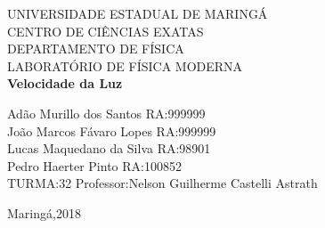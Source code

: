 \documentclass[a4paper,10pt]{article}
\begin{document}
	

\begin{titlepage}
\begin{center}
{\large UNIVERSIDADE ESTADUAL DE MARINGÁ}\\[0.2cm]
{\large CENTRO DE CIÊNCIAS EXATAS}\\[0.2cm]
{\large DEPARTAMENTO DE FÍSICA}\\[0.2cm]
{\large LABORATÓRIO DE FÍSICA MODERNA}\\[7.0cm]
{\bf \huge Velocidade da Luz}\\[7.0cm]
\end{center}
{\large Adão Murillo dos Santos \hfill RA:999999}\\[0.7cm]
{\large João Marcos Fávaro Lopes \hfill RA:999999}\\[0.7cm]
{\large Lucas Maquedano da Silva \hfill RA:98901}\\[0.7cm]
{\large Pedro Haerter Pinto \hfill RA:100852}\\[0.7cm]
{\large TURMA:32 \hfill Professor:Nelson Guilherme Castelli
Astrath}\\[1.0cm]
\begin{center}
{\large Maringá,2018}\\[0.2cm]
\end{center}
\end{titlepage}


\end{document}
